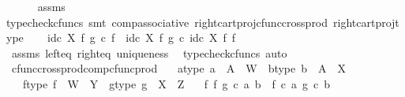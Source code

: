 \begin{isabellebody}
\ \ \ \ \isamarkupfalse%
\ assms\ \isamarkupfalse%
{\isacharparenleft}{\kern0pt}typecheck{\isacharunderscore}{\kern0pt}cfuncs{\isacharcomma}{\kern0pt}\ smt\ comp{\isacharunderscore}{\kern0pt}associative{}\ right{\isacharunderscore}{\kern0pt}cart{\isacharunderscore}{\kern0pt}proj{\isacharunderscore}{\kern0pt}cfunc{\isacharunderscore}{\kern0pt}cross{\isacharunderscore}{\kern0pt}prod\ right{\isacharunderscore}{\kern0pt}cart{\isacharunderscore}{\kern0pt}proj{\isacharunderscore}{\kern0pt}type{\isacharparenright}{\kern0pt}\isanewline
\ \ \isamarkupfalse%
\ {\isachardoublequoteopen}id\isactrlsub c\ X\ {\isasymtimes}\isactrlsub f\ g\ {\isasymcirc}\isactrlsub c\ f\ {\isacharequal}{\kern0pt}\ {\isacharparenleft}{\kern0pt}id\isactrlsub c\ X\ {\isasymtimes}\isactrlsub f\ g{\isacharparenright}{\kern0pt}\ {\isasymcirc}\isactrlsub c\ id\isactrlsub c\ X\ {\isasymtimes}\isactrlsub f\ f{\isachardoublequoteclose}\isanewline
\ \ \ \ \isamarkupfalse%
\ assms\ left{\isacharunderscore}{\kern0pt}eq\ right{\isacharunderscore}{\kern0pt}eq\ uniqueness\ \isamarkupfalse%
\ {\isacharparenleft}{\kern0pt}typecheck{\isacharunderscore}{\kern0pt}cfuncs{\isacharcomma}{\kern0pt}\ auto{\isacharparenright}{\kern0pt}\isanewline
{}\isamarkupfalse%
%
\endisatagproof
{\isafoldproof}%
%
\isadelimproof
\isanewline
%
\endisadelimproof
\isanewline
{}\isamarkupfalse%
\ cfunc{\isacharunderscore}{\kern0pt}cross{\isacharunderscore}{\kern0pt}prod{\isacharunderscore}{\kern0pt}comp{\isacharunderscore}{\kern0pt}cfunc{\isacharunderscore}{\kern0pt}prod{\isacharcolon}{\kern0pt}\isanewline
\ \ \ a{\isacharunderscore}{\kern0pt}type{\isacharcolon}{\kern0pt}\ {\isachardoublequoteopen}a\ {\isacharcolon}{\kern0pt}\ A\ {\isasymrightarrow}\ W{\isachardoublequoteclose}\ \ b{\isacharunderscore}{\kern0pt}type{\isacharcolon}{\kern0pt}\ {\isachardoublequoteopen}b\ {\isacharcolon}{\kern0pt}\ A\ {\isasymrightarrow}\ X{\isachardoublequoteclose}\isanewline
\ \ \ f{\isacharunderscore}{\kern0pt}type{\isacharcolon}{\kern0pt}\ {\isachardoublequoteopen}f\ {\isacharcolon}{\kern0pt}\ W\ {\isasymrightarrow}\ Y{\isachardoublequoteclose}\ \ g{\isacharunderscore}{\kern0pt}type{\isacharcolon}{\kern0pt}\ {\isachardoublequoteopen}g\ {\isacharcolon}{\kern0pt}\ X\ {\isasymrightarrow}\ Z{\isachardoublequoteclose}\isanewline
\ \ \ {\isachardoublequoteopen}{\isacharparenleft}{\kern0pt}f\ {\isasymtimes}\isactrlsub f\ g{\isacharparenright}{\kern0pt}\ {\isasymcirc}\isactrlsub c\ {\isasymlangle}a{\isacharcomma}{\kern0pt}\ b{\isasymrangle}\ {\isacharequal}{\kern0pt}\ {\isasymlangle}f\ {\isasymcirc}\isactrlsub c\ a{\isacharcomma}{\kern0pt}\ g\ {\isasymcirc}\isactrlsub c\ b{\isasymrangle}{\isachardoublequoteclose}\isanewline

\end{isabellebody}
